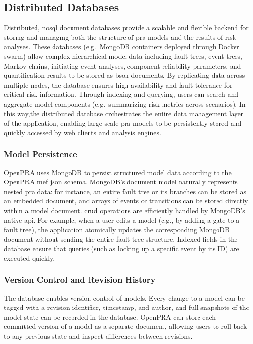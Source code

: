 \subsection{Distributed Databases}

Distributed, \acrshort{nosql} document databases provide a scalable and flexible backend for storing and managing both the structure of \acrshort{pra} models and the results of risk analyses. These databases (e.g.\ MongoDB containers deployed through Docker swarm) allow complex hierarchical model data including fault trees, event trees, Markov chains, initiating event analyses, component reliability parameters, and quantification results to be stored as \acrshort{bson} documents. By replicating data across multiple nodes, the database ensures high availability and fault tolerance for critical risk information. Through indexing and querying, users can search and aggregate model components (e.g.\ summarizing risk metrics across scenarios). In this way,the distributed database orchestrates the entire data management layer of the application, enabling large-scale \acrshort{pra} models to be persistently stored and quickly accessed by web clients and analysis engines.

\subsubsection{Model Persistence}

OpenPRA uses MongoDB to persist structured model data according to the OpenPRA \acrshort{mef} \acrshort{json} schema. MongoDB's document model naturally represents nested \acrshort{pra} data: for instance, an entire fault tree or its branches can be stored as an embedded document, and arrays of events or transitions can be stored directly within a model document. \acrshort{crud} operations are efficiently handled by MongoDB's native \acrshort{api}. For example, when a user edits a model (e.g., by adding a gate to a fault tree), the application atomically updates the corresponding MongoDB document without sending the entire fault tree structure. Indexed fields in the database ensure that queries (such as looking up a specific event by its ID) are executed quickly.

\subsubsection{Version Control and Revision History}

The database enables version control of models. Every change to a model can be tagged with a revision identifier, timestamp, and author, and full snapshots of the model state can be recorded in the database. OpenPRA can store each committed version of a model as a separate document, allowing users to roll back to any previous state and inspect differences between revisions.

